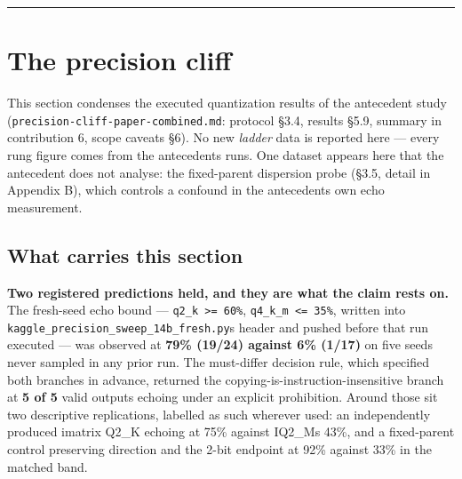 \begin{center}\rule{0.5\linewidth}{0.5pt}\end{center}

\hypertarget{the-precision-cliff}{%
\section{The precision cliff}\label{the-precision-cliff}}

This section condenses the executed quantization results of the antecedent study (\texttt{precision-cliff-paper-combined.md}: protocol §3.4, results §5.9, summary in contribution 6, scope caveats §6). No new \emph{ladder} data is reported here --- every rung figure comes from the antecedent\textquotesingle s runs. One dataset appears here that the antecedent does not analyse: the fixed-parent dispersion probe (§3.5, detail in Appendix B), which controls a confound in the antecedent\textquotesingle s own echo measurement.

\hypertarget{what-carries-this-section}{%
\subsection{What carries this section}\label{what-carries-this-section}}

\textbf{Two registered predictions held, and they are what the claim rests on.} The fresh-seed echo bound --- \texttt{q2\_k\ \textgreater{}=\ 60\%}, \texttt{q4\_k\_m\ \textless{}=\ 35\%}, written into \texttt{kaggle\_precision\_sweep\_14b\_fresh.py}\textquotesingle s header and pushed before that run executed --- was observed at \textbf{79\% (19/24) against 6\% (1/17)} on five seeds never sampled in any prior run. The must-differ decision rule, which specified both branches in advance, returned the copying-is-instruction-insensitive branch at \textbf{5 of 5} valid outputs echoing under an explicit prohibition. Around those sit two descriptive replications, labelled as such wherever used: an independently produced imatrix Q2\_K echoing at 75\% against IQ2\_M\textquotesingle s 43\%, and a fixed-parent control preserving direction and the 2-bit endpoint at 92\% against 33\% in the matched band.

